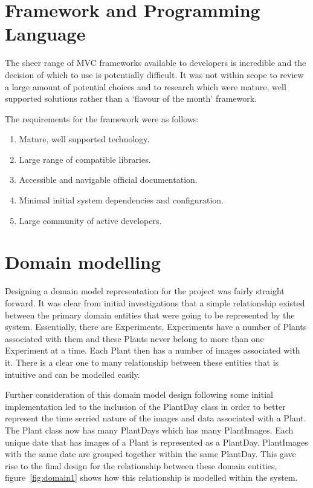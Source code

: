 \section{Framework and Programming Language}

The sheer range of MVC frameworks available to developers is incredible and the decision of which to use is potentially difficult. It was not within scope to review a large amount of potential choices and to research which were mature, well supported solutions rather than a `flavour of the month' framework. 

The requirements for the framework were as follows:
\begin{enumerate}
\item Mature, well supported technology.
\item Large range of compatible libraries.
\item Accessible and navigable official documentation.
\item Minimal initial system dependencies and configuration.
\item Large community of active developers.
\end{enumerate}

\section{Domain modelling}

Designing a domain model representation for the project was fairly straight forward. It was clear from initial investigations that a simple relationship existed between the primary domain entities that were going to be represented by the system. Essentially, there are Experiments, Experiments have a number of Plants associated with them and these Plants never belong to more than one Experiment at a time. Each Plant then has a number of images associated with it. There is a clear one to many relationship between these entities that is intuitive and can be modelled easily.

Further consideration of this domain model design following some initial implementation led to the inclusion of the PlantDay class in order to better represent the time serried nature of the images and data associated with a Plant. The Plant class now has many PlantDays which has many PlantImages. Each unique date that has images of a Plant is represented as a PlantDay. PlantImages with the same date are grouped together within the same PlantDay. This gave rise to the final design for the relationship between these domain entities, figure~\ref{fig:domain1} shows how this relationship is modelled within the system. 



